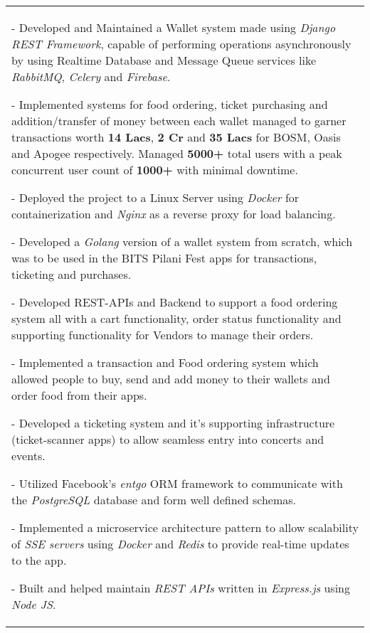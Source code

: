 \documentclass[a4paper,10pt]{extarticle} %
\begin{document}
\begin{tabular}{p{19.7cm}}
{\begin{description}[style=nextline, font=$\bullet$\hspace{2mm}\normalsize]
- Developed and Maintained a Wallet system made using \textit{Django REST Framework}, capable of performing operations asynchronously by
using Realtime Database and Message Queue services like \textit{RabbitMQ}, \textit{Celery} and \textit{Firebase}. 

- Implemented systems for food ordering,
ticket purchasing and addition/transfer of money between each wallet managed to garner transactions worth \textbf{14 Lacs}, \textbf{2 Cr} and \textbf{35 Lacs} for
BOSM, Oasis and Apogee respectively. Managed \textbf{5000+} total users with a peak concurrent user count of \textbf{1000+} with minimal downtime.

-  Deployed the project to a Linux Server using \textit{Docker} for containerization and \textit{Nginx} as a reverse proxy for load balancing.
\vspace{0.2cm}
 
\item[{{GO-Wallet}, Backend Developer}]
- Developed a \textit{Golang} version of a wallet system from scratch, which was to be used in the BITS Pilani Fest apps for transactions, ticketing and purchases.

- Developed REST-APIs and Backend to support a food ordering system all with a cart functionality, order status functionality and supporting functionality for Vendors to manage their orders.

- Implemented a transaction and Food ordering system which allowed people to buy, send and add money to their wallets and order food from their apps.

- Developed a ticketing system and it's supporting infrastructure (ticket-scanner apps) to allow seamless entry into concerts and events.

- Utilized Facebook's \textit{entgo} ORM framework to communicate with the \textit{PostgreSQL} database and form well defined schemas.

-  Implemented a microservice architecture pattern to allow scalability of \textit{SSE servers} using \textit{Docker} and \textit{Redis} to provide real-time updates
to the app.

\vspace{0.2cm}


 \item[{\href{https://yearbook.bits-sarc.org}{Yearbook Portal}, Core Backend Developer}] 
- Built and helped maintain \textit{REST APIs} written in \textit{Express.js} using \textit{Node JS}.


\end{description}}
\end{tabular}
\end{document}
